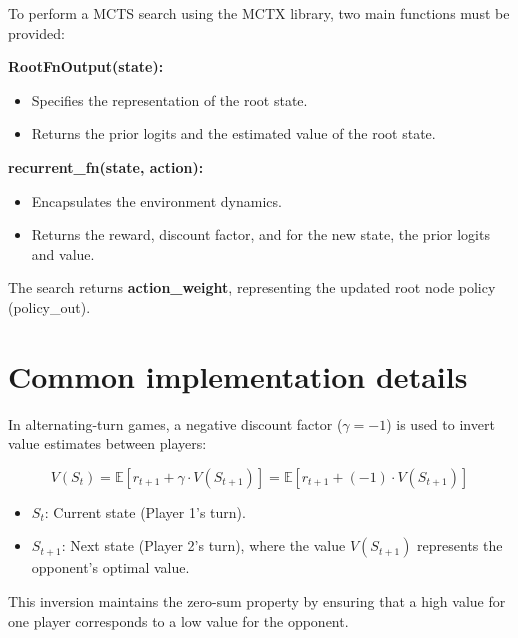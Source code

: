 \documentclass[aspectratio=169,xcolor=dvipsnames]{beamer}
\begin{document}
\begin{frame}{}
To perform a MCTS search using the MCTX library, two main functions must be provided:

\medskip
\textbf{RootFnOutput(state):}
\begin{itemize}
    \item Specifies the representation of the root state.
    \item Returns the prior logits and the estimated value of the root state.
\end{itemize}

\medskip
\textbf{recurrent\_fn(state, action):}
\begin{itemize}
    \item Encapsulates the environment dynamics.
    \item Returns the reward, discount factor, and for the new state, the prior logits and value.
\end{itemize}


\vspace{3.0em}
    The search returns \textbf{action\_weight}, representing the updated root node policy (policy\_out).
\end{frame}

\section{Common implementation details}


\begin{frame}{}

In alternating-turn games, a negative discount factor (\(\gamma = -1\)) is used to invert value estimates between players:

\medskip
\[
    V(S_t) = \mathbb{E} \left[ r_{t+1} + \gamma \cdot V(S_{t+1}) \right] = \mathbb{E} \left[ r_{t+1} + (-1) \cdot V(S_{t+1}) \right]
\]
\begin{itemize}
    \item \(S_t\): Current state (Player 1’s turn).
    \item \(S_{t+1}\): Next state (Player 2’s turn), where the value \(V(S_{t+1})\) represents the opponent's optimal value.
\end{itemize}

\medskip
This inversion maintains the zero-sum property by ensuring that a high value for one player corresponds to a low value for the opponent.
\end{frame}
\end{document}
